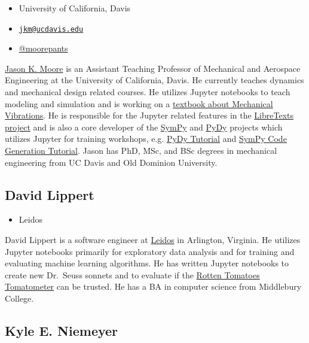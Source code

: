 \documentclass[]{book}
\providecommand{\tightlist}{%
  \setlength{\itemsep}{0pt}\setlength{\parskip}{0pt}}
\begin{document}
\begin{itemize}
\tightlist
\item
  University of California, Davis
\item
  \href{mailto:jkm@ucdavis.edu}{\nolinkurl{jkm@ucdavis.edu}}
\item
  \href{https://twitter.com/moorepants}{@moorepants}
\end{itemize}

\href{http://moorepants.info/}{Jason K. Moore} is an Assistant Teaching
Professor of Mechanical and Aerospace Engineering at the University of
California, Davis. He currently teaches dynamics and mechanical design
related courses. He utilizes Jupyter notebooks to teach modeling and
simulation and is working on a
\href{https://moorepants.github.io/resonance}{textbook about Mechanical
Vibrations}. He is responsible for the Jupyter related features in the
\href{http://libretexts.org}{LibreTexts project} and is also a core
developer of the \href{http://sympy.org/}{SymPy} and
\href{http://pydy.org/}{PyDy} projects which utilizes Jupyter for
training workshops, e.g.
\href{https://www.sympy.org/scipy-2017-codegen-tutorial/}{PyDy Tutorial}
and \href{https://github.com/pydy/pydy-tutorial-human-standing}{SymPy
Code Generation Tutorial}. Jason has PhD, MSc, and BSc degrees in
mechanical engineering from UC Davis and Old Dominion University.

\subsection*{David Lippert}\label{david-lippert}

\begin{itemize}
\tightlist
\item
  Leidos
\end{itemize}

David Lippert is a software engineer at
\href{https://www.leidos.com}{Leidos} in Arlington, Virginia. He
utilizes Jupyter notebooks primarily for exploratory data analysis and
for training and evaluating machine learning algorithms. He has written
Jupyter notebooks to create new Dr.~Seuss sonnets and to evaluate if the
\href{https://www.rottentomatoes.com/about}{Rotten Tomatoes Tomatometer}
can be trusted. He has a BA in computer science from Middlebury College.

\subsection*{Kyle E. Niemeyer}\label{kyle-e.-niemeyer}
\end{document}
